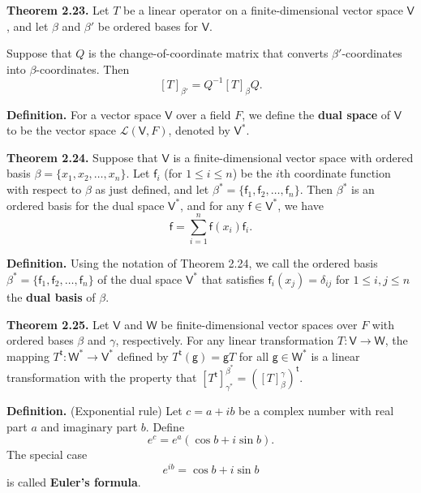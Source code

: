 \documentclass{article}
\newcommand{\0}{\mathit{0}}
\begin{document}
\textbf{Theorem 2.23.} Let $T$ be a linear operator on a finite-dimensional vector
space $\mathsf{V}$, and let $\beta$ and $\beta'$ be ordered bases for $\mathsf{V}$.

Suppose that $Q$ is the change-of-coordinate matrix that converts
$\beta'$-coordinates into $\beta$-coordinates. Then
\[
    \left[ T \right]_{\beta'} = Q^{-1} \left[ T \right]_{\beta} Q.
\]


\medskip

\textbf{Definition.} For a vector space $\mathsf{V}$ over a field $F$, we define the
\textbf{dual space} of $\mathsf{V}$ to be the vector space $\mathcal{L}(\mathsf{V}, F)$,
denoted by $\mathsf{V}^*$.

\medskip

\textbf{Theorem 2.24.} Suppose that $\mathsf{V}$ is a finite-dimensional vector space with
ordered basis $\beta = \{x_1, x_2, \dots, x_n\}$. Let $\mathsf{f}_i$ (for $1 \leq i \leq n$) be the
$i$th coordinate function with respect to $\beta$ as just defined, and let
$\beta^* = \{\mathsf{f}_1, \mathsf{f}_2, \dots, \mathsf{f}_n\}$.
Then $\beta^*$ is an ordered basis for the dual space $\mathsf{V}^*$, and for any
$\mathsf{f} \in \mathsf{V}^*$, we have
\[
    \mathsf{f} = \sum_{i=1}^{n} \mathsf{f}(x_i)\mathsf{f}_i.
\]

\medskip

\textbf{Definition.} Using the notation of Theorem 2.24, we call the ordered basis
$\beta^* = \{\mathsf{f}_1, \mathsf{f}_2, \dots, \mathsf{f}_n\}$ of the dual space $\mathsf{V}^*$ that satisfies
$\mathsf{f}_i(x_j) = \delta_{ij}$ for $1 \leq i, j \leq n$ the \textbf{dual basis} of $\beta$.

\medskip

\textbf{Theorem 2.25.} Let $\mathsf{V}$ and $\mathsf{W}$ be finite-dimensional vector spaces over
$F$ with ordered bases $\beta$ and $\gamma$, respectively. For any linear transformation
$T: \mathsf{V} \to \mathsf{W}$, the mapping
$T^{\mathsf{t}} : \mathsf{W}^* \to \mathsf{V}^*$
defined by $T^{\mathsf{t}}(\mathsf{g}) = \mathsf{g}T$ for all $\mathsf{g} \in \mathsf{W}^*$
is a linear transformation with the property that
\(
\left[ T^{\mathsf{t}} \right]^{\beta^*}_{\gamma^*} = \left( \left[ T \right]^\gamma_\beta \right)^{\mathsf{t}}.
\)

\textbf{Definition.} (Exponential rule) Let $c = a + ib$ be a complex number with real part $a$ and
imaginary part $b$. Define
\[
    e^c = e^a(\cos b + i \sin b).
\]
The special case
\[
    e^{ib} = \cos b + i \sin b
\]
is called \textbf{Euler's formula}.
\end{document}
